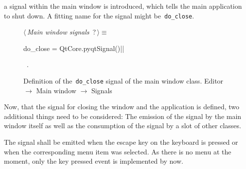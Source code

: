 \documentclass[%
    a4paper,    %
    justified,  %
    nobib,      %
    openany     %
]{tufte-book}
\begin{document}
 a signal within the main window is
introduced, which tells the main application to shut down. A fitting name for
the signal might be~\verb=do_close=.

\begin{figure}
\begin{flushleft} \small
\begin{minipage}{\linewidth}\label{scrap16}\raggedright\small
{} $\langle\,${\itshape Main window signals}\nobreak\ {\footnotesize {?}}$\,\rangle\equiv$
\vspace{-1ex}
\begin{pythoncode}
do_close = QtCore.pyqtSignal()|\NWsep|
\end{pythoncode}
\vspace{1.5ex}
\footnotesize
\begin{list}{}{\setlength{\itemsep}{-\parsep}\setlength{\itemindent}{-\leftmargin}}
\item \NWtxtMacroRefIn\ .

\item{}
\end{list}
\end{minipage}\vspace{4ex}
\end{flushleft}
\caption{Definition of the~\texttt{do\_close} signal of the main window class.
  \newline{}\newline{}Editor $\rightarrow$ Main window $\rightarrow$ Signals}
\label{editor:lst:main-window:signals}
\end{figure}

Now, that the signal for closing the window and the application is defined, two
additional things need to be considered: The emission of the signal by
the main window itself as well as the consumption of the signal by a slot of
other classes.

The signal shall be emitted when the escape key on the keyboard is pressed or
when the corresponding menu item was selected. As there is no menu at the
moment, only the key pressed event is implemented by now.
\end{document}
